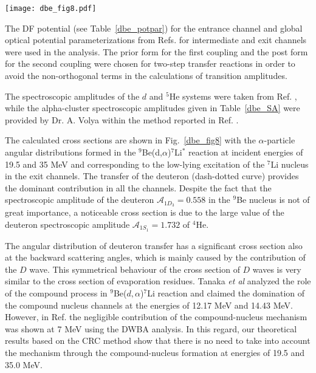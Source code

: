 \documentclass[
12pt, %
oneside, %
english, %
doublespacing, %
doublespacing, %
toctotoc, %
parskip, %
headsepline, %
]{MastersDoctoralThesis} %
\begin{document}
\begin{figure*}[tp]
\centering
\texttt{[image: dbe\_fig8.pdf]}
\decoRule
\caption{  Differential cross sections for the ${}^9$Be($d$,$\alpha$)${}^7$Li reactions measured at 19.5 MeV and 35 MeV energy with the ${}^{7}$Li observed in the ground or low-lying excited states in the exit channels.}
\label{dbe_fig8}
\end{figure*}	


The DF potential (see Table~\ref{dbe_potpar}) for the entrance channel and global optical potential parameterizations from Refs. \cite{globalTriton, globalAlpha, global6Li} for intermediate and exit channels were used in the analysis.
The prior form for the first coupling and the post form for the second coupling were chosen for two-step transfer reactions in order to avoid the non-orthogonal terms in the calculations of transition amplitudes.


The spectroscopic amplitudes of the $d$ and ${}^5$He systems were taken from Ref. \cite{fiveSA}, while the alpha-cluster spectroscopic amplitudes given in Table~\ref{dbe_SA} were provided by Dr. A. Volya within the method reported in Ref. \cite{volya2017}.

The calculated cross sections are shown in Fig.~\ref{dbe_fig8} with the $\alpha$-particle angular distributions formed in the ${}^9$Be(d,$\alpha$)${}^7$Li$^*$ reaction at incident energies of 19.5 and 35 MeV and corresponding to the low-lying excitation of the ${}^7$Li nucleus in the exit channels. The transfer of the deuteron (dash-dotted curve) provides the dominant contribution in all the channels. Despite the fact that the spectroscopic amplitude of the deuteron $\mathcal{A}_{1{D}_3}=0.558$ in the ${}^9$Be nucleus is not of great importance, a noticeable cross section is due to the large value of the deuteron spectroscopic amplitude $\mathcal{A}_{1{S}_1}=1.732$  of ${}^4$He.

The angular distribution of deuteron transfer has a significant cross section also at the backward scattering angles, which is mainly caused by the contribution of the $D$ wave. This symmetrical behaviour of the cross section of $D$ waves is very similar to the cross section of evaporation residues. Tanaka \textit{et al} \cite{tanaka1978} analyzed the role of the compound process in ${}^9$Be($d,\alpha$)${}^7$Li reaction and claimed the domination of the compound nucleus channels at the energies of 12.17 MeV and 14.43 MeV. However, in Ref. \cite{bodek1989} the negligible contribution of the compound-nucleus mechanism was shown at 7 MeV using the DWBA analysis. In this regard, our theoretical results based on the CRC method show that there is no need to take into account the mechanism through the compound-nucleus formation at energies of 19.5 and 35.0 MeV.
\end{document}
